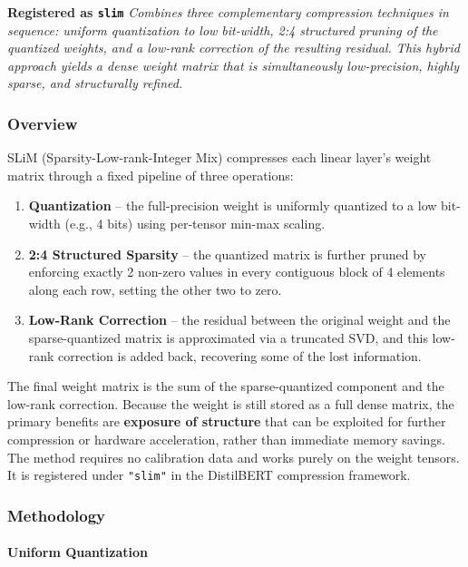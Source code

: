 \textbf{Registered as \texttt{slim}}
\textit{Combines three complementary compression techniques in sequence: uniform quantization to low bit-width, 2:4 structured pruning of the quantized weights, and a low-rank correction of the resulting residual. This hybrid approach yields a dense weight matrix that is simultaneously low-precision, highly sparse, and structurally refined.}


\subsubsection*{Overview}

SLiM (Sparsity-Low-rank-Integer Mix) compresses each linear layer's weight matrix through a fixed pipeline of three operations:

\begin{enumerate}
\item \textbf{Quantization} -- the full-precision weight is uniformly quantized to a low bit-width (e.g., 4 bits) using per-tensor min-max scaling.
\item \textbf{2:4 Structured Sparsity} -- the quantized matrix is further pruned by enforcing exactly 2 non-zero values in every contiguous block of 4 elements along each row, setting the other two to zero.
\item \textbf{Low-Rank Correction} -- the residual between the original weight and the sparse-quantized matrix is approximated via a truncated SVD, and this low-rank correction is added back, recovering some of the lost information.

\end{enumerate}
The final weight matrix is the sum of the sparse-quantized component and the low-rank correction. Because the weight is still stored as a full dense matrix, the primary benefits are \textbf{exposure of structure} that can be exploited for further compression or hardware acceleration, rather than immediate memory savings. The method requires no calibration data and works purely on the weight tensors. It is registered under \texttt{"slim"} in the DistilBERT compression framework.


\subsubsection*{Methodology}

\paragraph{Uniform Quantization}

